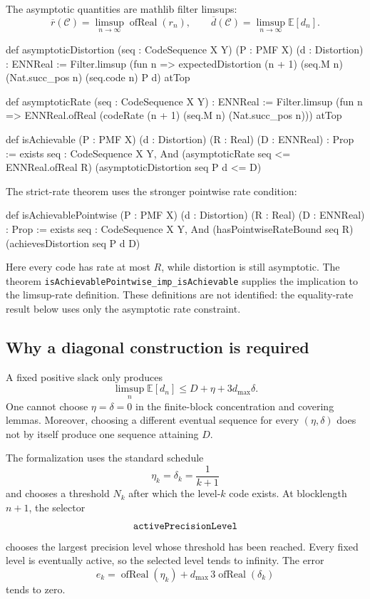\documentclass[11pt]{article}
\newcommand{\E}{\mathbb{E}}
\newcommand{\dmax}{d_{\max}}
\begin{document}
The asymptotic quantities are mathlib filter limsups:
\[
  \overline r(\mathcal C)
   =\limsup_{n\to\infty}\operatorname{ofReal}(r_n),
  \qquad
  \overline d(\mathcal C)
   =\limsup_{n\to\infty}\E[d_n].
\]

\begin{LeanCode}
def asymptoticDistortion (seq : CodeSequence X Y)
    (P : PMF X) (d : Distortion) : ENNReal :=
  Filter.limsup (fun n => expectedDistortion (n + 1) (seq.M n)
    (Nat.succ_pos n) (seq.code n) P d) atTop

def asymptoticRate (seq : CodeSequence X Y) : ENNReal :=
  Filter.limsup (fun n => ENNReal.ofReal
    (codeRate (n + 1) (seq.M n) (Nat.succ_pos n))) atTop

def isAchievable (P : PMF X) (d : Distortion)
    (R : Real) (D : ENNReal) : Prop :=
  exists seq : CodeSequence X Y, And
    (asymptoticRate seq <= ENNReal.ofReal R)
    (asymptoticDistortion seq P d <= D)
\end{LeanCode}

The strict-rate theorem uses the stronger pointwise rate condition:
\begin{LeanCode}
def isAchievablePointwise (P : PMF X) (d : Distortion)
    (R : Real) (D : ENNReal) : Prop :=
  exists seq : CodeSequence X Y, And
    (hasPointwiseRateBound seq R)
    (achievesDistortion seq P d D)
\end{LeanCode}
Here every code has rate at most $R$, while distortion is still asymptotic.
The theorem \texttt{is\allowbreak Achievable\allowbreak Pointwise\_\allowbreak imp\_\allowbreak is\allowbreak Achievable} supplies the
implication to the limsup-rate definition. These definitions are not identified:
the equality-rate result below uses only the asymptotic rate constraint.

\subsection{Why a diagonal construction is required}

A fixed positive slack only produces
\[
  \limsup_n\E[d_n]\le D+\eta+3\dmax\delta.
\]
One cannot choose $\eta=\delta=0$ in the finite-block concentration and covering
lemmas.  Moreover, choosing a different eventual sequence for every
$(\eta,\delta)$ does not by itself produce one sequence attaining $D$.

The formalization uses the standard schedule
\[
  \eta_k=\delta_k=\frac1{k+1}
\]
and chooses a threshold $N_k$ after which the level-$k$ code exists.  At
blocklength $n+1$, the selector
\[\texttt{active\allowbreak Precision\allowbreak Level}\]
chooses the largest precision level whose threshold has been reached.  Every fixed level is eventually
active, so the selected level tends to infinity.  The error
\[
  e_k=\operatorname{ofReal}(\eta_k)
       +\dmax\,3\operatorname{ofReal}(\delta_k)
\]
tends to zero.
\end{document}
